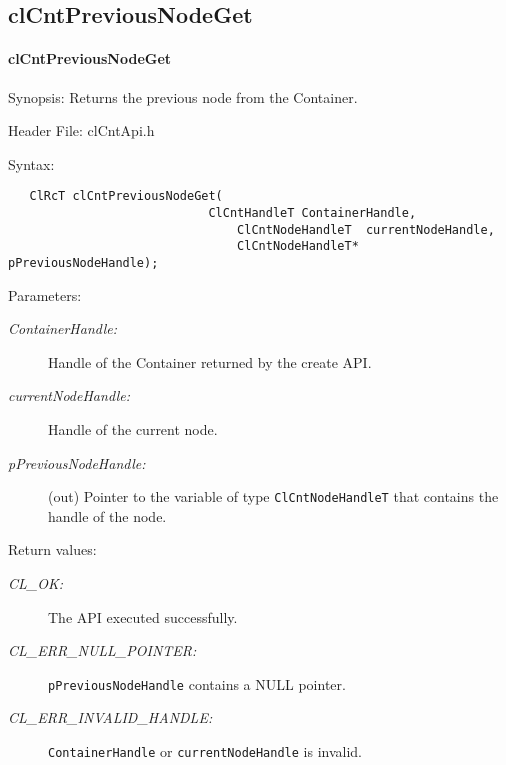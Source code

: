 \subsection{clCntPreviousNodeGet}
\hypertarget{pagecnt113}{}\paragraph{cl\-Cnt\-Previous\-Node\-Get}\label{pagecnt113}
\begin{Desc}
\item[Synopsis:]Returns the previous node from the Container.\end{Desc}
\begin{Desc}
\item[Header File:]clCntApi.h\end{Desc}
\begin{Desc}
\item[Syntax:]

\footnotesize\begin{verbatim}   ClRcT clCntPreviousNodeGet(
              		  		ClCntHandleT ContainerHandle,
                          		ClCntNodeHandleT  currentNodeHandle,	
                          		ClCntNodeHandleT* pPreviousNodeHandle);
\end{verbatim}
\normalsize
\end{Desc}
\begin{Desc}
\item[Parameters:]
\begin{description}
\item[{\em Container\-Handle:}]Handle of the Container returned by the create API. 
\item[{\em current\-Node\-Handle:}]Handle of the current node. 
\item[{\em p\-Previous\-Node\-Handle:}](out) Pointer to the variable of type {\tt{Cl\-Cnt\-Node\-Handle\-T}} that contains 
the handle of the node.
\end{description}
\end{Desc}
\begin{Desc}
\item[Return values:]
\begin{description}
\item[{\em CL\_\-OK:}]The API executed successfully. 
\item[{\em CL\_\-ERR\_\-NULL\_\-POINTER:}]{\tt{pPreviousNodeHandle}} contains a NULL pointer. 
\item[{\em CL\_\-ERR\_\-INVALID\_\-HANDLE:}]{\tt{ContainerHandle}} or {\tt{currentNodeHandle}} is invalid.
\end{description}
\end{Desc}
